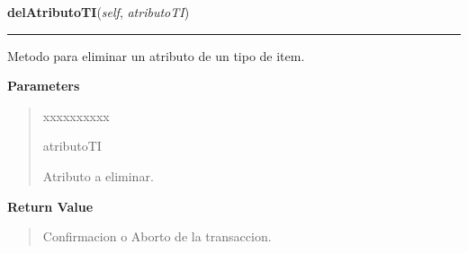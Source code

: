 \hspace{.8\funcindent}\begin{boxedminipage}{\funcwidth}

    \raggedright \textbf{delAtributoTI}(\textit{self}, \textit{atributoTI})

    \vspace{-1.5ex}

    \rule{\textwidth}{0.5\fboxrule}
\setlength{\parskip}{2ex}
    Metodo para eliminar un atributo de un tipo de item.

\setlength{\parskip}{1ex}
      \textbf{Parameters}
      \vspace{-1ex}

      \begin{quote}
        \begin{Ventry}{xxxxxxxxxx}

          \item[atributoTI]

          Atributo a eliminar.

        \end{Ventry}

      \end{quote}

      \textbf{Return Value}
    \vspace{-1ex}

      \begin{quote}
      Confirmacion o Aborto de la transaccion.

      \end{quote}

    \end{boxedminipage}

